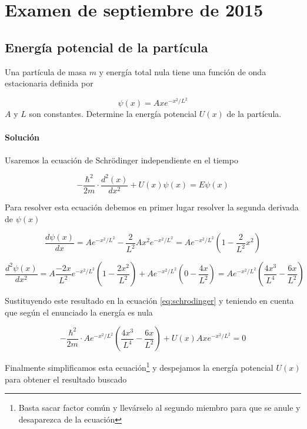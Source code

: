 \documentclass[12pt, a4paper]{article}
\begin{document}
    \section{Examen de septiembre de 2015}
    \setcounter{subsection}{0}
    \subsection{Energía potencial de la partícula}
    Una partícula de masa $m$ y energía total nula tiene una función de onda estacionaria
    definida por

    $$\psi(x)=Axe^{-x^2/L^2}$$
    $A$ y $L$ son constantes. Determine la energía potencial $U(x)$ de la partícula.

    \paragraph{\textbf{Solución}}

    \paragraph{} Usaremos la ecuación de Schrödinger independiente en el tiempo

    \begin{equation}    \label{eq:schrodinger}
        -\frac{\hbar^2}{2m}\cdot\frac{d^2(x)}{dx^2}+U(x)\psi(x)=E\psi(x)
    \end{equation}


    Para resolver esta ecuación debemos en primer lugar resolver la segunda derivada de $\psi(x)$

    $$\frac{d\psi(x)}{dx} = A e^{-x^2/L^2}-\frac{2}{L^2} A x^2 e^{-x^2/L^2} = A e^{-x^2/L^2}\left(1-\frac{2}{L^2}x^2\right)$$

    $$\frac{d^2\psi(x)}{dx^2} = A \frac{-2x}{L^2}e^{-x^2/L^2}\left(1-\frac{2x^2}{L^2}\right)+
		Ae^{-x^2/L^2}\left(0-\frac{4x}{L^2}\right) =
		A e^{-x^2/L^2} \left(\frac{4x^3}{L^4}-\frac{6x}{L^2}\right)$$

    Sustituyendo este resultado en la ecuación \ref{eq:schrodinger} y teniendo en cuenta que según el enunciado la energía es nula

    $$-\frac{\hbar^2}{2m}\cdot A e^{-x^2/L^2} \left(\frac{4x^3}{L^4}-\frac{6x}{L^2}\right) + U(x) A x e^{-x^2/L^2} = 0$$

    Finalmente simplificamos esta ecuación\footnote{Basta sacar factor común y llevárselo al segundo miembro
    para que se anule y desaparezca de la ecuación}
    y despejamos la energía potencial $U(x)$ para obtener el resultado buscado
\end{document}
